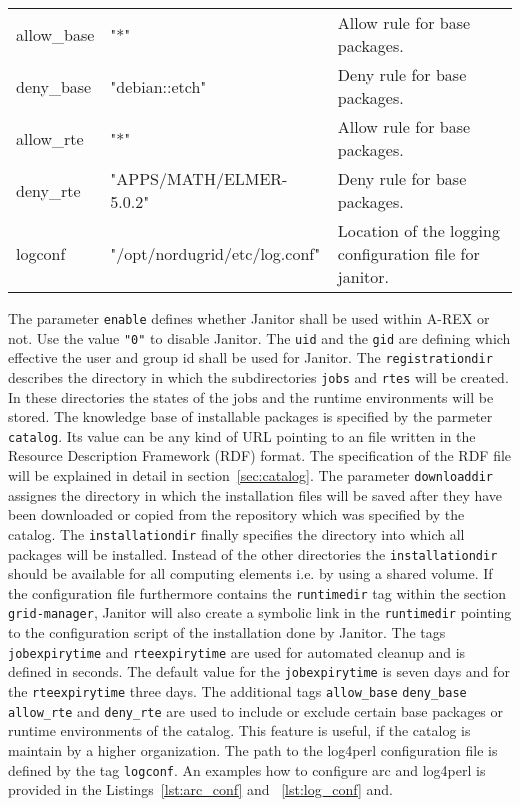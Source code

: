 \begin{landscape}
\begin{table}[!h]
\begin{center}
\begin{longtable}{|p{3cm}|p{10cm}||p{10cm}|}
	   allow\_base     & "*"                                   & Allow rule for base packages. \\
	   deny\_base      & "debian::etch"                        & Deny rule for base packages.\\
	   allow\_rte      & "*"                                   & Allow rule for base packages. \\
	   deny\_rte       & "APPS/MATH/ELMER-5.0.2"               & Deny rule for base packages. \\
	   logconf         & "/opt/nordugrid/etc/log.conf"         & Location of the logging configuration file for janitor.\\
	\hline
	\end{longtable}
   \end{center}
\end{table}
\end{landscape}

The parameter \texttt{enable} defines whether Janitor shall be used within A-REX or not. Use the value \texttt{"0"} to disable Janitor. The
\texttt{uid} and the \texttt{gid} are defining which effective the user and group id shall be used for Janitor. 
The \texttt{registrationdir} describes the directory in which the subdirectories \texttt{jobs} and \texttt{rtes} will be created.
In these directories the states of the jobs and the runtime environments will be stored. 
The knowledge base of installable packages is specified by the parmeter \texttt{catalog}. 
Its value can be any kind of URL pointing to an file written in the Resource Description Framework (RDF) format.
The specification of the RDF file will be explained in detail in section~\ref{sec:catalog}.
The parameter \texttt{downloaddir} assignes the directory in which the installation files will be saved after they have been 
downloaded or copied from the repository which was specified by the catalog. The \texttt{installationdir} finally specifies the
directory into which all packages will be installed. Instead of the other directories the \texttt{installationdir} should be 
available for all computing elements i.e. by using a shared volume.
If the configuration file furthermore contains the \texttt{runtimedir} tag within the section \texttt{grid-manager}, Janitor will also
create a symbolic link in the \texttt{runtimedir} pointing to the configuration script of the installation done by Janitor.
The tags \texttt{jobexpirytime} and \texttt{rteexpirytime} are used for automated cleanup and is defined in seconds.
The default value for the \texttt{jobexpirytime} is seven days and for the \texttt{rteexpirytime} three days. 
The additional tags \texttt{allow\_base} \texttt{deny\_base} \texttt{allow\_rte} and \texttt{deny\_rte} are used to include
or exclude certain base packages or runtime environments of the catalog. This feature is useful, if the catalog is maintain by
a higher organization.
The path to the log4perl configuration file is defined by the tag \texttt{logconf}.
An examples how to configure arc and log4perl is provided in the Listings~\ref{lst:arc_conf} and ~\ref{lst:log_conf} and.

